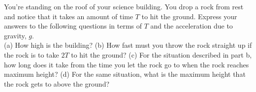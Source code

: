 %
You're standing on the roof of your science building. You drop a rock
from rest and notice that it takes an amount of time $T$ to hit the
ground. Express your answers to the following questions in terms of
$T$ and the acceleration due to gravity, $g$.\\
%
(a) How high is the building?\answercheck\hwendpart
%
(b) How fast must you throw the rock straight
up if the rock is to take $2T$ to hit the
ground?\answercheck\hwendpart
%
(c) For the situation described in part b, how long does it take from the time you let the rock go to
when the rock reaches maximum height?\answercheck\hwendpart
%
(d) For the same situation, what is the maximum height that the rock gets to above the
ground?\answercheck
